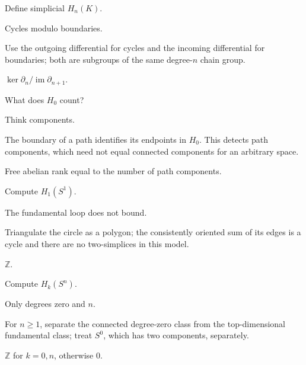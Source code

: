 \begin{exercise}\label{exr:viii17-04}
Define simplicial \(H_n(K)\).
\end{exercise}
\begin{hint}
Cycles modulo boundaries.

Use the outgoing differential for cycles and the incoming differential for boundaries; both are subgroups of the same degree-\(n\) chain group.
\end{hint}
\begin{solution}
\(\ker\partial_n/\operatorname{im}\partial_{n+1}\).
\end{solution}

\begin{exercise}\label{exr:viii17-05}
What does \(H_0\) count?
\end{exercise}
\begin{hint}
Think components.

The boundary of a path identifies its endpoints in \(H_0\). This detects path components, which need not equal connected components for an arbitrary space.
\end{hint}
\begin{solution}
Free abelian rank equal to the number of path components.
\end{solution}

\begin{exercise}\label{exr:viii17-06}
Compute \(H_1(S^1)\).
\end{exercise}
\begin{hint}
The fundamental loop does not bound.

Triangulate the circle as a polygon; the consistently oriented sum of its edges is a cycle and there are no two-simplices in this model.
\end{hint}
\begin{solution}
\(\mathbb Z\).
\end{solution}

\begin{exercise}\label{exr:viii17-07}
Compute \(H_k(S^n)\).
\end{exercise}
\begin{hint}
Only degrees zero and \(n\).

For \(n\ge1\), separate the connected degree-zero class from the top-dimensional fundamental class; treat \(S^0\), which has two components, separately.
\end{hint}
\begin{solution}
\(\mathbb Z\) for \(k=0,n\), otherwise \(0\).
\end{solution}

